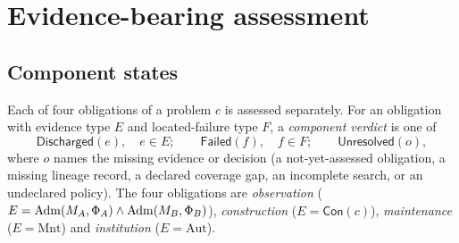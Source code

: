 \section{Evidence-bearing assessment}\label{sec:assessment}

\subsection{Component states}
Each of four obligations of a problem $c$ is assessed separately. For an obligation with evidence type $E$ and located-failure type $F$, a \emph{component verdict} is one of
\[
\mathsf{Discharged}(e),\quad e \in E; \qquad \mathsf{Failed}(f),\quad f \in F; \qquad \mathsf{Unresolved}(o),
\]
where $o$ names the missing evidence or decision (a not-yet-assessed obligation, a missing lineage record, a declared coverage gap, an incomplete search, or an undeclared policy). The four obligations are \emph{observation} ($E = \mathrm{Adm}(M_A,\Phi_A) \wedge \mathrm{Adm}(M_B,\Phi_B)$), \emph{construction} ($E = \mathsf{Con}(c)$), \emph{maintenance} ($E = \mathrm{Mnt}$) and \emph{institution} ($E = \mathrm{Aut}$).


